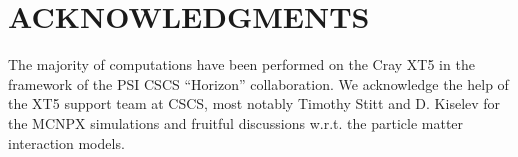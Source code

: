 \documentclass[acus]{JAC2003}
\begin{document}




\section{ACKNOWLEDGMENTS}
The majority of computations have been performed on the Cray XT5 in the
framework of the PSI CSCS ``Horizon'' collaboration.  We acknowledge the
help of the XT5 support team at CSCS, most notably Timothy Stitt and D. Kiselev 
for the MCNPX simulations and fruitful discussions w.r.t. the particle matter interaction models.



%






\end{document}
